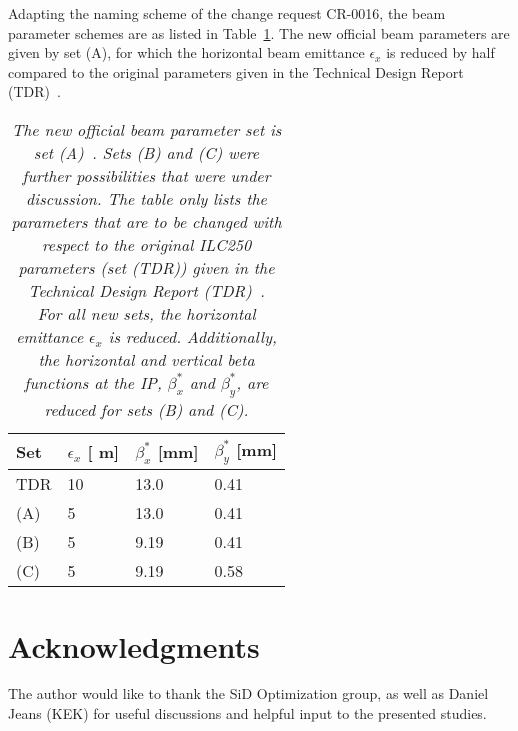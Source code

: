 \documentclass[12pt]{article}
\newcommand{\murm}{%
  \ifmmode
    \mathchoice
        {\hbox{\normalsize\textmu}}
        {\hbox{\normalsize\textmu}}
        {\hbox{\scriptsize\textmu}}
        {\hbox{\tiny\textmu}}%
  \else
    \textmu
  \fi
}
\begin{document}
Adapting the naming scheme of the change request CR-0016, the beam parameter schemes are as listed in Table~\ref{tab:Parameters}.
The new official beam parameters are given by set (A), for which the horizontal beam emittance  $\epsilon_x$ is reduced by half compared to the original parameters given in the Technical Design Report (TDR)~\cite[p. 11]{TDR1}.
\begin{table}[h]
\caption{\textit{The new official beam parameter set is set (A)~\cite{CR-0016}.
Sets (B) and (C) were further possibilities that were under discussion.
The table only lists the parameters that are to be changed with respect to the original ILC250 parameters (set (TDR)) given in the Technical Design Report (TDR)~\cite[p. 11]{TDR1}.\\
For all new sets, the horizontal emittance $\epsilon_x$ is reduced. 
Additionally, the horizontal and vertical beta functions at the IP, $\beta^*_x$ and $\beta^*_y$, are reduced for sets (B) and (C).}}
\label{tab:Parameters}
\centering
\begin{tabularx}{0.52\textwidth}{llll}
\hline\hline
\textbf{Set}  & \textbf{$\epsilon_x$ [\murm m]} & \textbf{$\beta^*_x$ [mm]} & \textbf{$\beta^*_y$ [mm]}\\
\hline
\cline{1-4}
\hline
 TDR & 10 & 13.0 & 0.41\\
 \rowcolor{Gray}
 (A) & 5 & 13.0 & 0.41\\
 (B) & 5 & 9.19 & 0.41\\
 (C) & 5 & 9.19 & 0.58\\
\hline\hline
\end{tabularx}
\end{table}







\section*{Acknowledgments}
The author would like to thank the SiD Optimization group, as well as Daniel Jeans (KEK) for useful discussions and helpful input to the presented studies.

%




\end{document}
